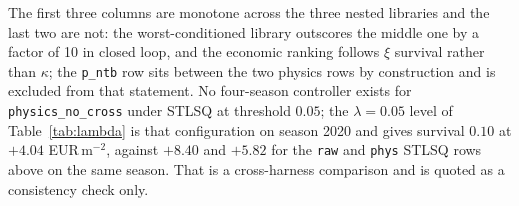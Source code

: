 \begin{table}[t]
\vspace{2pt}
\begin{minipage}{\linewidth}\footnotesize
The first three columns are monotone across the three nested libraries and the last two
are not: the worst-conditioned library outscores the middle one by a factor of 10 in
closed loop, and the economic ranking follows $\xi$ survival rather than $\kappa$; the
\texttt{p\_ntb} row sits between the two physics rows by construction and is excluded from
that statement. No four-season controller exists for \texttt{physics\_no\_cross} under
STLSQ at threshold $0.05$; the $\lambda=0.05$
level of Table~\ref{tab:lambda} is that configuration on season 2020 and gives survival
$0.10$ at $+4.04$ EUR\,m$^{-2}$, against $+8.40$ and $+5.82$ for the \texttt{raw} and
\texttt{phys} STLSQ rows above
on the same season. That is a cross-harness comparison and is quoted as a consistency
check only.
\end{minipage}
\end{table}

